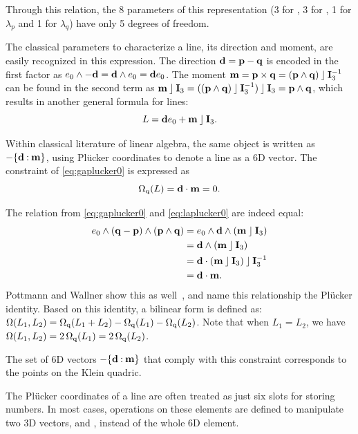 Through this relation, the 8 parameters of this representation (3 for , 3 for , 1 for $\lambda_p$ and 1 for $\lambda_q$) have only 5 degrees of freedom.  

The classical parameters to characterize a line, its direction and moment, are easily recognized in this expression.  The direction $\mathbf{d} = \mathbf{p} - \mathbf{q}$ is encoded in the first factor as $e_0 \wedge -\mathbf{d} = \mathbf{d} \wedge e_0 = \mathbf{d} e_0$.  
The moment $\mathbf{m} = \mathbf{p} \times \mathbf{q} = (\mathbf{p} \wedge \mathbf{q}) \mathbin{\rfloor} \mathbf{I}_3^{-1}$ can be found in the second term as $\mathbf{m} \mathbin{\rfloor} \mathbf{I}_3 = ((\mathbf{p} \wedge \mathbf{q}) \mathbin{\rfloor} \mathbf{I}_3^{-1}) \mathbin{\rfloor} \mathbf{I}_3 = \mathbf{p} \wedge \mathbf{q}$, which results in another general formula for lines:
\begin{equation*}
  L = \mathbf{d} e_0 + \mathbf{m} \mathbin{\rfloor} \mathbf{I}_3.
\end{equation*}

Within classical literature of linear algebra, the same object is written as $-\{\mathbf{d} \mathbin{:} \mathbf{m}\}$, using Pl\"ucker coordinates to denote a line as a 6D vector.  The constraint of \autoref{eq:gaplucker0} is expressed as 
\begin{equation} \label{eq:laplucker0}
  \operatorname{\Omega_q}(L) = \mathbf{d} \mathbin{\cdot} \mathbf{m} = 0 .
\end{equation}

The relation from \autoref{eq:gaplucker0} and \autoref{eq:laplucker0} are indeed equal:
\begin{align*}
  e_0 \wedge (\mathbf{q} - \mathbf{p}) \wedge (\mathbf{p} \wedge \mathbf{q}) 
  &= e_0 \wedge \mathbf{d} \wedge (\mathbf{m} \mathbin{\rfloor} \mathbf{I}_3) \\
  &= \mathbf{d} \wedge (\mathbf{m} \mathbin{\rfloor} \mathbf{I}_3) \\
  &= \mathbf{d} \mathbin{\cdot} (\mathbf{m} \mathbin{\rfloor} \mathbf{I}_3) \mathbin{\rfloor} \mathbf{I}_3^{-1} \\
  &= \mathbf{d} \mathbin{\cdot} \mathbf{m} .
\end{align*}
Pottmann and Wallner show this as well~\cite[Lemma 2.1.2]{Pottmann}, and name this relationship the Pl\"ucker identity.  Based on this identity, a bilinear form is defined as: $\operatorname{\Omega}(L_1, L_2) = \operatorname{\Omega_q}(L_1 + L_2) - \operatorname{\Omega_q}(L_1) - \operatorname{\Omega_q}(L_2)$.  Note that when $L_1 = L_2$, we have $\operatorname{\Omega}(L_1, L_2) = 2 \operatorname{\Omega_q}(L_1) = 2 \operatorname{\Omega_q}(L_2)$.

The set of 6D vectors $-\{\mathbf{d} \mathbin{:} \mathbf{m}\}$ that comply with this constraint corresponds to the points on the Klein quadric.

The Pl\"ucker coordinates of a line are often treated as just six slots for storing numbers.  In most cases, operations on these elements are defined to manipulate two 3D vectors,  and , instead of the whole 6D element.  

